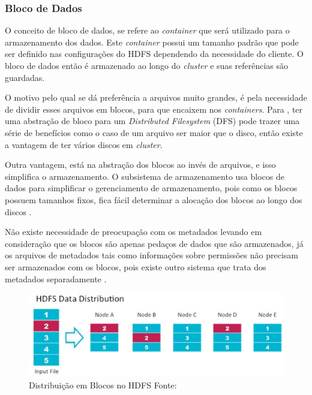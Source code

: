             \subsubsection{Bloco de Dados}

                O conceito de bloco de dados, se refere ao \textit{container} que será utilizado para o armazenamento
                dos dados. Este \textit{container} possui um tamanho padrão que pode ser definido nas configurações
                do HDFS dependendo da necessidade do cliente. O bloco de dados então é armazenado ao longo do
                \textit{cluster} e suas referências são guardadas.

                O motivo pelo qual se dá preferência a arquivos muito grandes, é pela necessidade de dividir esses
                arquivos em blocos, para que encaixem nos \textit{containers}. Para , ter
                uma abstração de bloco para um \textit{Distributed Filesystem} (DFS) pode trazer uma série de
                benefícios como o caso de um arquivo ser maior que o disco, então existe a vantagem de ter vários
                discos em \textit{cluster}.

                Outra vantagem, está na abstração dos blocos ao invés de arquivos, e isso simplifica o armazenamento.
                O subsistema de armazenamento usa blocos de dados para simplificar o gerenciamento de armazenamento,
                pois como os blocos possuem tamanhos fixos, fica fácil determinar a alocação dos blocos ao longo dos
                discos \cite{white2015}.

                Não existe necessidade de preocupação com os metadados levando em consideração que os blocos são
                apenas pedaços de dados que são armazenados, já os arquivos de metadados tais como informações sobre
                permissões não precisam ser armazenados com os blocos, pois existe outro sistema que trata dos metadados
                separadamente \cite{shvachko2010}.

                \begin{figure}[ht!]
                    \centering
                    \includegraphics[keepaspectratio=true,scale=0.75]
                        {figuras/figura1.eps}
                    \caption[Distribuição em Blocos no HDFS]{Distribuição em Blocos no HDFS
                    \protect\linebreak Fonte: }
                    \label{figura1}
                \end{figure}

